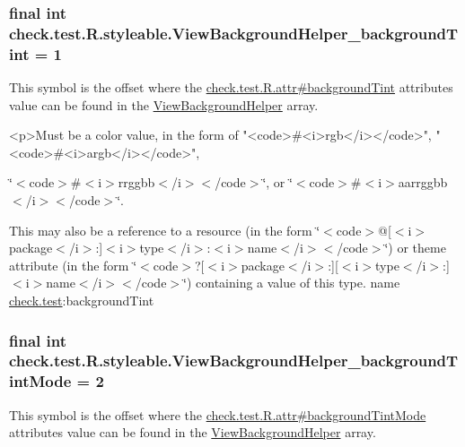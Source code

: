 \subsubsection[{View\+Background\+Helper\+\_\+background\+Tint}]{\setlength{\rightskip}{0pt plus 5cm}final int check.\+test.\+R.\+styleable.\+View\+Background\+Helper\+\_\+background\+Tint = 1\hspace{0.3cm}{\ttfamily [static]}}\label{classcheck_1_1test_1_1_r_1_1styleable_a0d48384e17b37e236f9349fd6ec90051}
This symbol is the offset where the \hyperlink{classcheck_1_1test_1_1_r_1_1attr_a9fef2f05f0fb4a8733f460d560d8ef0d}{check.\+test.\+R.\+attr\#background\+Tint} attribute\textquotesingle{}s value can be found in the \hyperlink{classcheck_1_1test_1_1_r_1_1styleable_ae6adc75d344e9e404acc591e2de26ff7}{View\+Background\+Helper} array.

\begin{DoxyVerb}      <p>Must be a color value, in the form of "<code>#<i>rgb</i></code>", "<code>#<i>argb</i></code>",
\end{DoxyVerb}
 \char`\"{}$<$code$>$\#$<$i$>$rrggbb$<$/i$>$$<$/code$>$\char`\"{}, or \char`\"{}$<$code$>$\#$<$i$>$aarrggbb$<$/i$>$$<$/code$>$\char`\"{}. 

This may also be a reference to a resource (in the form \char`\"{}$<$code$>$@\mbox{[}$<$i$>$package$<$/i$>$\+:\mbox{]}$<$i$>$type$<$/i$>$\+:$<$i$>$name$<$/i$>$$<$/code$>$\char`\"{}) or theme attribute (in the form \char`\"{}$<$code$>$?\mbox{[}$<$i$>$package$<$/i$>$\+:\mbox{]}\mbox{[}$<$i$>$type$<$/i$>$\+:\mbox{]}$<$i$>$name$<$/i$>$$<$/code$>$\char`\"{}) containing a value of this type.  name \hyperlink{namespacecheck_1_1test}{check.\+test}\+:background\+Tint \hypertarget{classcheck_1_1test_1_1_r_1_1styleable_a45ca8f11081793216f1476f206f628e7}{}
\subsubsection[{View\+Background\+Helper\+\_\+background\+Tint\+Mode}]{\setlength{\rightskip}{0pt plus 5cm}final int check.\+test.\+R.\+styleable.\+View\+Background\+Helper\+\_\+background\+Tint\+Mode = 2\hspace{0.3cm}{\ttfamily [static]}}\label{classcheck_1_1test_1_1_r_1_1styleable_a45ca8f11081793216f1476f206f628e7}
This symbol is the offset where the \hyperlink{classcheck_1_1test_1_1_r_1_1attr_a30ef6484cfe3015f32395a912756a38f}{check.\+test.\+R.\+attr\#background\+Tint\+Mode} attribute\textquotesingle{}s value can be found in the \hyperlink{classcheck_1_1test_1_1_r_1_1styleable_ae6adc75d344e9e404acc591e2de26ff7}{View\+Background\+Helper} array.

